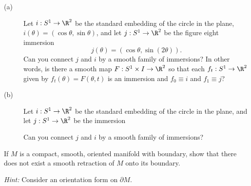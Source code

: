 \documentclass[12pt]{pset}
\begin{document}
\pagebreak

\begin{problem}

% 

  \begin{description}
  \item[(a)] Let $i : S^1 \to \R^2$ be the standard embedding of the
    circle in the plane, $i(\theta) = \left(\cos \theta, \sin
      \theta\right)$, and let $j : S^1 \to \R^2$ be the figure eight
    immersion $$j(\theta) = \left(\cos \theta, \sin (2\theta)\right).$$
    Can you connect $j$ and $i$ by a smooth family of immersions?  In
    other words, is there a smooth map $F : S^1 \times I \to \R^2$ so
    that each $f_t : S^1 \to \R^2$ given by $f_t(\theta) =
    F(\theta,t)$ is an immersion and $f_0 \equiv i$ and $f_1 \equiv
    j$?

  \item[(b)] Let $i : S^1 \to \R^2$ be the standard embedding of the
    circle in the plane, and let $j : S^1 \to \R^2$ be the immersion
    \begin{center}
    \end{center}
  Can you connect $j$ and $i$ by a smooth family of immersions?
  \end{description}


\end{problem}

\vfill

\begin{problem}[Lee 14--6]

If $M$ is a compact, smooth, oriented manifold with boundary, show
that there does not exist a smooth retraction of $M$ onto its boundary.  

\vspace{1ex}\noindent\textit{Hint:} Consider an orientation form on
$\partial M$.

\end{problem}

\vfill
\vfill
\end{document}
